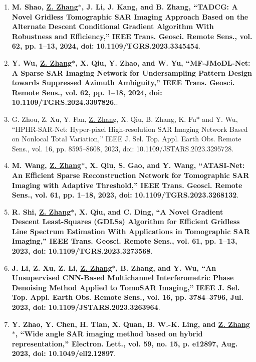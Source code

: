 \documentclass[paper=a4,fontsize=11pt]{scrartcl}
\begin{document}
\begin{enumerate}
\item \textbf{M. Shao, \underline{Z. Zhang$\ast$}, J. Li, J. Kang, and B. Zhang, ``TADCG: A Novel Gridless Tomographic SAR Imaging Approach Based on the Alternate Descent Conditional Gradient Algorithm With Robustness and Efficiency,'' IEEE Trans. Geosci. Remote Sens., vol. 62, pp. 1–13, 2024, doi: 10.1109/TGRS.2023.3345454}.

\item \textbf{Y. Wu, \underline{Z. Zhang$\ast$}, X. Qiu, Y. Zhao, and W. Yu, ``MF-JMoDL-Net: A Sparse SAR Imaging Network for Undersampling Pattern Design towards Suppressed Azimuth Ambiguity,'' IEEE Trans. Geosci. Remote Sens., vol. 62, pp. 1–18, 2024, doi: 10.1109/TGRS.2024.3397826.}.

\item G. Zhou, Z. Xu, Y. Fan, \underline{Z. Zhang}, X. Qiu, B. Zhang, K. Fu$\ast$ and Y. Wu, ``HPHR-SAR-Net: Hyper-pixel High-resolution SAR Imaging Network Based on Nonlocal Total Variation,'' IEEE J. Sel. Top. Appl. Earth Obs. Remote Sens., vol. 16, pp. 8595–8608, 2023, doi: 10.1109/JSTARS.2023.3295728.

\item \textbf{M. Wang, \underline{Z. Zhang$\ast$}, X. Qiu, S. Gao, and Y. Wang, ``ATASI-Net: An Efficient Sparse Reconstruction Network for Tomographic SAR Imaging with Adaptive Threshold,'' IEEE Trans. Geosci. Remote Sens., vol. 61, pp. 1–18, 2023, doi: 10.1109/TGRS.2023.3268132}.	

\item \textbf{R. Shi, \underline{Z. Zhang$\ast$}, X. Qiu, and C. Ding, ``A Novel Gradient Descent Least-Squares (GDLSs) Algorithm for Efficient Gridless Line Spectrum Estimation With Applications in Tomographic SAR Imaging,'' IEEE Trans. Geosci. Remote Sens., vol. 61, pp. 1–13, 2023, doi: 10.1109/TGRS.2023.3273568}.

\item \textbf{J. Li, Z. Xu, Z. Li, \underline{Z. Zhang$\ast$}, B. Zhang, and Y. Wu, ``An Unsupervised CNN-Based Multichannel Interferometric Phase Denoising Method Applied to TomoSAR Imaging,'' IEEE J. Sel. Top. Appl. Earth Obs. Remote Sens., vol. 16, pp. 3784–3796, Jul. 2023, doi: 10.1109/JSTARS.2023.3263964}.

\item \textbf{Y. Zhao, Y. Chen, H. Tian, X. Quan, B. W.-K. Ling, and \underline{Z. Zhang$\ast$}, ``Wide angle SAR imaging method based on hybrid representation,'' Electron. Lett., vol. 59, no. 15, p. e12897, Aug. 2023, doi: 10.1049/ell2.12897}.


\end{enumerate}
\end{document}
